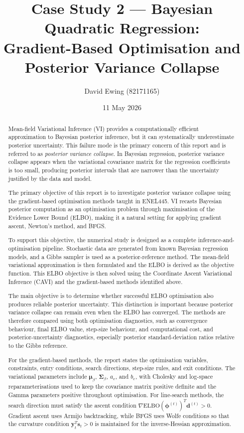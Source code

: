 \documentclass[11pt,a4paper]{article}
\title{
Case Study 2 --- Bayesian Quadratic Regression:\\[0.4em]
Gradient-Based Optimisation and Posterior Variance Collapse
}
\author{
  David Ewing (82171165)\\
}
\date{11 May 2026}
\newcommand{\ELBO}{\text{ELBO}}
\begin{document}
\maketitle

\begin{abstract}
\setlength{\parindent}{0pt}
\setlength{\parskip}{0.7em}


\setlength{\parindent}{0pt}
\setlength{\parskip}{0.7em}

Mean-field Variational Inference (VI) provides a computationally efficient approximation to Bayesian posterior inference, but it can systematically underestimate posterior uncertainty. This failure mode is the primary concern of this report and is referred to as \emph{posterior variance collapse}. In Bayesian regression, posterior variance collapse appears when the variational covariance matrix for the regression coefficients is too small, producing posterior intervals that are narrower than the uncertainty justified by the data and model.

The primary objective of this report is to investigate posterior variance collapse using the gradient-based optimisation methods taught in ENEL445.
 VI recasts Bayesian posterior computation as an optimisation problem through maximisation of the Evidence Lower Bound (ELBO), 
 making it a natural setting for applying gradient ascent, Newton's method, and BFGS. 

To support this objective, the numerical study is designed as a complete inference-and-optimisation pipeline. 
Stochastic data are generated from known Bayesian regression models, and a Gibbs sampler is used as a posterior-reference method. 
The mean-field variational approximation is then formulated and the ELBO is derived as the objective function. 
This ELBO objective is then solved using the 
 Coordinate Ascent Variational Inference (CAVI)   and the  gradient-based methods identified above.

The main objective is to determine whether successful ELBO optimisation also produces reliable posterior uncertainty. This distinction is important because posterior variance collapse can remain even when the ELBO has converged. The methods are therefore compared using both optimisation diagnostics, such as convergence behaviour, final ELBO value, step-size behaviour, and computational cost, and posterior-uncertainty diagnostics, especially posterior standard-deviation ratios relative to the Gibbs reference.

For the gradient-based methods, the report states the optimisation variables, constraints, entry conditions, search directions, step-size rules, and exit conditions. The variational parameters include $\bm{\mu}_\beta$, $\bm{\Sigma}_\beta$, $a_e$, and $b_e$, with Cholesky and log-space reparameterisations used to keep the covariance matrix positive definite and the Gamma parameters positive throughout optimisation. For line-search methods, the search direction must satisfy the ascent condition $\nabla\ELBO(\bm{\phi}^{(t)})^T\bm{d}^{(t)} > 0$. Gradient ascent uses Armijo backtracking, while BFGS uses Wolfe conditions so that the curvature condition $\bm{y}_t^T\bm{s}_t>0$ is maintained for the inverse-Hessian approximation.


\end{abstract}
\end{document}
